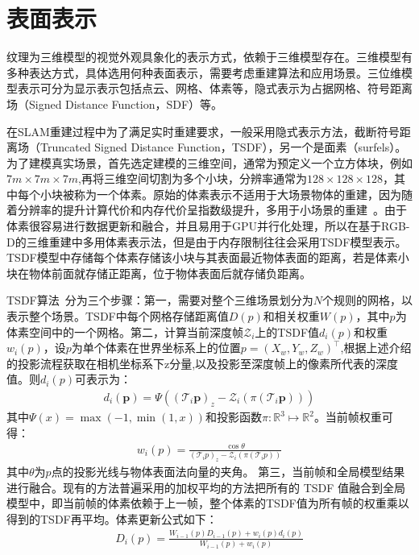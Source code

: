 %
%
\section{表面表示}
纹理为三维模型的视觉外观具象化的表示方式，依赖于三维模型存在。三维模型有多种表达方式，具体选用何种表面表示，需要考虑重建算法和应用场景。三位维模型表示可分为显示表示包括点云、网格、体素等，隐式表示为占据网格、符号距离场（Signed Distance Function，SDF）等。\par
在SLAM重建过程中为了满足实时重建要求，一般采用隐式表示方法，截断符号距离场（Truncated Signed Distance Function，TSDF），另一个是面素（surfels）。为了建模真实场景，首先选定建模的三维空间，通常为预定义一个立方体块，例如$7m \times 7m \times 7m$,再将三维空间切割为多个小块，分辨率通常为$128 \times 128 \times 128$，其中每个小块被称为一个体素。原始的体素表示不适用于大场景物体的重建，因为随着分辨率的提升计算代价和内存代价呈指数级提升，多用于小场景的重建~\cite{nguyen2018rendernet}。由于体素很容易进行数据更新和融合，并且易用于GPU并行化处理，所以在基于RGB-D的三维重建中多用体素表示法，但是由于内存限制往往会采用TSDF模型表示。TSDF模型中存储每个体素存储该小块与其表面最近物体表面的距离，若是体素小块在物体前面就存储正距离，位于物体表面后就存储负距离。\par
TSDF算法~\cite{BrianCurless1996AVM}分为三个步骤：第一，需要对整个三维场景划分为$N$个规则的网格，以表示整个场景。TSDF中每个网格存储距离值$D(p)$和相关权重$W(p)$，其中$p$为体素空间中的一个网格。第二，计算当前深度帧$\mathcal{Z}_{i}$上的TSDF值$d_i(p)$和权重$w_i(p)$，设$p$为单个体素在世界坐标系上的位置$p = (X_w,Y_w,Z_w)^\top$,根据上述介绍的投影流程获取在相机坐标系下z分量,以及投影至深度帧上的像素所代表的深度值。则$d_i(p)$可表示为：
\begin{align}
d_{i}(\boldsymbol{p})=\Psi\left(\left(\mathcal{T}_{i} \boldsymbol{p}\right)_{z}-\mathcal{Z}_{i}\left(\pi\left(\mathcal{T}_{i} \boldsymbol{p}\right)\right)\right) 
\end{align}
其中$\Psi(x) =\max \left(-1, \min \left(1, x\right)\right)$和投影函数$ \pi: \mathbb{R}^{3} \mapsto \mathbb{R}^{2}$。当前帧权重可得：
\begin{align}
w_i(p) = \frac{ \cos \theta} { \left(\mathcal{T}_{i} p\right)_{z}-\mathcal{Z}_{i}\left(\pi\left(\mathcal{T}_{i}p\right)\right)} 
\end{align}其中$\theta$为$p$点的投影光线与物体表面法向量的夹角。
第三，当前帧和全局模型结果进行融合。现有的方法普遍采用的加权平均的方法把所有的 TSDF 值融合到全局模型中，即当前帧的体素依赖于上一帧，整个体素的TSDF值为所有帧的权重乘以得到的TSDF再平均。体素更新公式如下：
\begin{align}
D_{i}(p)=\frac{W_{i-1}(p) D_{i-1}(p)+w_{i}(p) d_{i}(p)}{W_{i-1}(p)+w_{i}(p)} 
\end{align}

